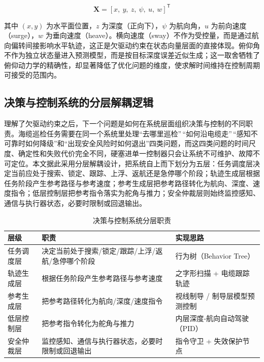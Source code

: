\begin{equation}
\mathbf{X} = [x,\ y,\ z,\ \psi,\ u,\ w]^{\mathsf{T}}
\label{eq:ch04-state-vector}
\end{equation}

其中 \((x,y)\) 为水平面位置，\(z\) 为深度（正向下），\(\psi\) 为航向角，\(u\) 为前向速度（surge），\(w\) 为垂向速度（heave）。横向速度（sway）不作为受控量，而是通过航向偏转间接影响水平轨迹，这正是欠驱动约束在状态向量层面的直接体现。俯仰角不作为独立状态量进入预测模型，而是按目标深度误差近似生成；这一取舍牺牲了俯仰动力学的精确性，却显著降低了优化问题的维度，使求解时间维持在控制周期可接受的范围内。

\subsection{决策与控制系统的分层解耦逻辑}\label{sec:ch04-4-1-2}

理解了欠驱动约束之后，下一个问题是如何在系统层面组织决策与控制的不同职责。海缆巡检任务需要在同一个系统里处理``去哪里巡检''\,``如何沿电缆走''\,``感知不可靠时如何降级''和``出现安全风险时如何退出''四类问题，而这四类问题的时间尺度、确定性和失败代价完全不同，硬塞进单一控制器只会让系统不可维护、故障不可定位。本文据此采用分层解耦设计，把系统自上而下划分为五层：任务调度层决定当前应处于搜索、锁定、跟踪、上浮、返航还是急停哪个阶段；轨迹生成层根据任务阶段产生参考路径与参考速度；参考生成层把参考路径转化为航向、深度、速度指令；低层控制层把参考指令落实为舵角与推力；安全仲裁层则始终监控感知、通信与执行器状态，必要时限制或回退输出。

\begin{longtable}[]{@{}
  >{\raggedright\arraybackslash}p{}
  >{\raggedright\arraybackslash}p{}
  >{\raggedright\arraybackslash}p{}@{}}
\caption{决策与控制系统分层职责}\label{tab:ch04-control-layers}\tabularnewline
\toprule\noalign{}
层级 & 职责 & 实现思路 \\
\midrule\noalign{}
\endhead
\bottomrule\noalign{}
\endlastfoot
任务调度层 & 决定当前处于搜索/锁定/跟踪/上浮/返航/急停哪个阶段 & 行为树（Behavior Tree） \\
轨迹生成层 & 根据任务阶段产生参考路径与参考速度 & 之字形扫描 + 电缆跟踪轨迹 \\
参考生成层 & 把参考路径转化为航向/深度/速度指令 & 视线制导 / 制导层模型预测控制 \\
低层控制层 & 把参考指令转化为舵角与推力 & 内层深度-航向自动驾驶（PID） \\
安全仲裁层 & 监控感知、通信与执行器状态，必要时限制或回退输出 & 指令守卫 + 失效保护节点 \\
\end{longtable}

